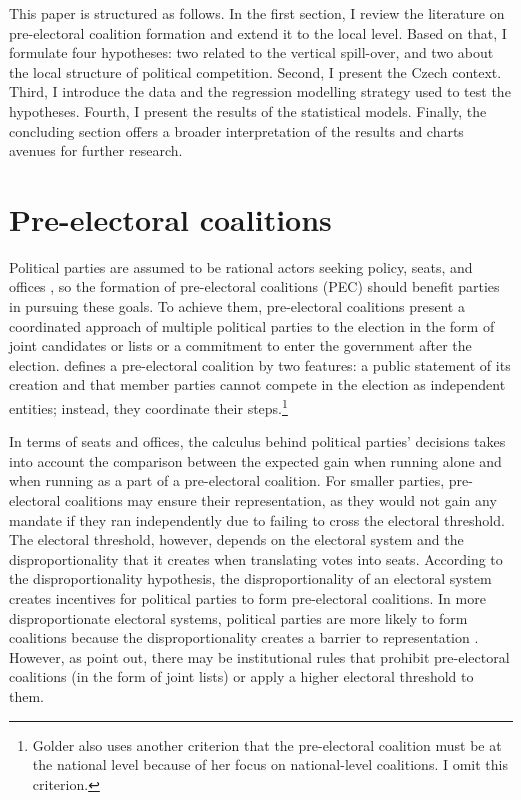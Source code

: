 \documentclass[]{interact}
\theoremstyle{plain}%
\theoremstyle{definition}
\theoremstyle{remark}
\begin{document}
This paper is structured as follows. In the first section, I review the literature on pre-electoral coalition formation and extend it to the local level. Based on that, I formulate four hypotheses: two related to the vertical spill-over, and two about the local structure of political competition. Second, I present the Czech context. Third, I introduce the data and the regression modelling strategy used to test the hypotheses. Fourth, I present the results of the statistical models. Finally, the concluding section offers a broader interpretation of the results and charts avenues for further research. 

\section{Pre-electoral coalitions}

Political parties are assumed to be rational actors seeking policy, seats, and offices \citep{muller1999}, so the formation of pre-electoral coalitions (PEC) should benefit parties in pursuing these goals. To achieve them, pre-electoral coalitions present a coordinated approach of multiple political parties to the election in the form of joint candidates or lists or a commitment to enter the government after the election. \citet[12]{golder2006} defines a pre-electoral coalition by two features: a public statement of its creation and that member parties cannot compete in the election as independent entities; instead, they coordinate their steps.\footnote{Golder also uses another criterion that the pre-electoral coalition must be at the national level because of her focus on national-level coalitions. I omit this criterion.}

In terms of seats and offices, the calculus behind political parties' decisions takes into account the comparison between the expected gain when running alone and when running as a part of a pre-electoral coalition. For smaller parties, pre-electoral coalitions may ensure their representation, as they would not gain any mandate if they ran independently due to failing to cross the electoral threshold. The electoral threshold, however, depends on the electoral system and the disproportionality that it creates when translating votes into seats. According to the disproportionality hypothesis, the disproportionality of an electoral system creates incentives for political parties to form pre-electoral coalitions. In more disproportionate electoral systems, political parties are more likely to form coalitions because the disproportionality creates a barrier to representation \citep{golder2005}. However, as \citet{ibenskas2018} point out, there may be institutional rules that prohibit pre-electoral coalitions (in the form of joint lists) or apply a higher electoral threshold to them.
\end{document}
